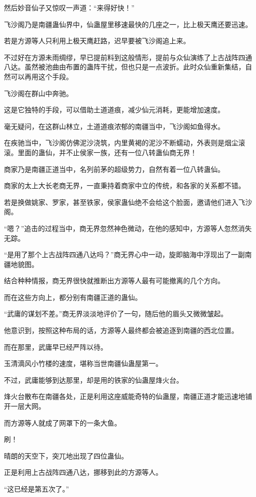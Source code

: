 \begin{this_body}
然后妙音仙子又惊叹一声道：“来得好快！”

飞沙阁乃是南疆蛊仙界中，仙蛊屋里移速最快的几座之一，比上极天鹰还要迅速。

若是方源等人只利用上极天鹰赶路，迟早要被飞沙阁追上来。

不过好在方源未雨绸缪，早已提前料到这般情形，提前与众仙演练了上古战阵四通八达。虽然被池曲由布置的蛊阵干扰，但也只是一点波折。此时众仙重新集结，自然可以再用这个手段。

飞沙阁在群山中奔驰。

这是它独特的手段，可以借助土道道痕，减少仙元消耗，更能增加速度。

毫无疑问，在这群山林立，土道道痕浓郁的南疆当中，飞沙阁如鱼得水。

在疾驰当中，飞沙阁仿佛泥沙浇筑，内里黄褐的泥沙不断蠕动，外表则是烟尘滚滚。里面的蛊仙，并不止侯家一族，还有一位八转蛊仙商无界！

商家乃是南疆正道当中，名列前茅的超级势力，自然有着一位八转蛊仙。

商家的太上大长老商无界，一直秉持着商家中立的传统，和各家的关系都不错。

若是换做姚家、罗家，甚至铁家，侯家蛊仙绝不会给这个脸面，邀请他们进入飞沙阁。

“嗯？”追击的过程当中，商无界忽然神色微动，在他的感知中，方源等人忽然消失无踪。

“是用了那个上古战阵四通八达吗？”商无界心中一动，旋即脑海中浮现出了一副南疆地貌图。

结合种种情报，商无界很快就推断出方源等人最有可能撤离的几个方向。

而在这些方向上，都分别有南疆正道的蛊仙。

“武庸的谋划不差。”商无界淡淡地评价了一句，随后他的眉头又微微皱起。

他意识到，按照这种布局的话，方源等人最终都会被追逐到南疆的西北位置。

而在那里，武庸早已经严阵以待。

玉清滴风小竹楼的速度，堪称当世南疆仙蛊屋第一。

不过，武庸能够到达那里，却是用的铁家的仙蛊屋烽火台。

烽火台散布在南疆各处，正是利用这座威能奇特的仙蛊屋，南疆正道才能迅速地铺开一层大网。

而方源等人就成了网罩下的一条大鱼。

刷！

晴朗的天空下，突兀地出现了四位蛊仙。

正是利用上古战阵四通八达，挪移到此的方源等人。

“这已经是第五次了。”


\end{this_body}

